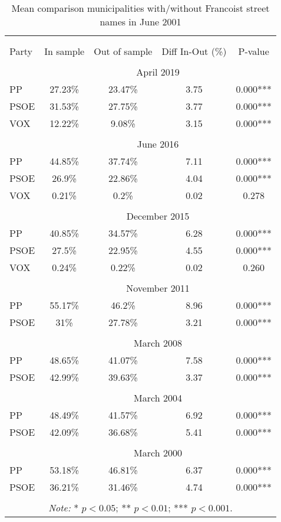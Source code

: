 \begin{table}[!htbp] \centering
\caption{Mean comparison municipalities with/without Francoist street names in June 2001}
\label{tab:ttest_sample2001}
\small
\begin{tabular}{lcccc}
\\[-1.8ex]\hline
\hline \\[-1.8ex]
\\[-1.8ex]
Party & In sample & Out of sample & Diff In-Out (\%) & P-value \\
\hline \\[-1.8ex]
& \multicolumn{4}{c}{April 2019}\\
PP & 27.23\% & 23.47\% & 3.75 & 0.000*** \\
PSOE & 31.53\% & 27.75\% & 3.77 & 0.000*** \\
VOX & 12.22\% & 9.08\% & 3.15 & 0.000*** \\
\hline \\[-1.8ex]
& \multicolumn{4}{c}{June 2016}\\
PP & 44.85\% & 37.74\% & 7.11 & 0.000*** \\
PSOE & 26.9\% & 22.86\% & 4.04 & 0.000*** \\
VOX & 0.21\% & 0.2\% & 0.02 & 0.278 \\
\hline \\[-1.8ex]
& \multicolumn{4}{c}{December 2015}\\
PP & 40.85\% & 34.57\% & 6.28 & 0.000*** \\
PSOE & 27.5\% & 22.95\% & 4.55 & 0.000*** \\
VOX & 0.24\% & 0.22\% & 0.02 & 0.260 \\
\hline \\[-1.8ex]
& \multicolumn{4}{c}{November 2011}\\
PP & 55.17\% & 46.2\% & 8.96 & 0.000*** \\
PSOE & 31\% & 27.78\% & 3.21 & 0.000*** \\
\hline \\[-1.8ex]
& \multicolumn{4}{c}{March 2008}\\
PP & 48.65\% & 41.07\% & 7.58 & 0.000*** \\
PSOE & 42.99\% & 39.63\% & 3.37 & 0.000*** \\
\hline \\[-1.8ex]
& \multicolumn{4}{c}{March 2004}\\
PP & 48.49\% & 41.57\% & 6.92 & 0.000*** \\
PSOE & 42.09\% & 36.68\% & 5.41 & 0.000*** \\
\hline \\[-1.8ex]
& \multicolumn{4}{c}{March 2000}\\
PP & 53.18\% & 46.81\% & 6.37 & 0.000*** \\
PSOE & 36.21\% & 31.46\% & 4.74 & 0.000*** \\
\hline
\hline \\[-1.8ex]
\multicolumn{5}{c}{\parbox[t]{0.65\textwidth}{\textit{Note:} * $p<0.05$; ** $p<0.01$; *** $p<0.001$.}}\\
\end{tabular}
\end{table}
